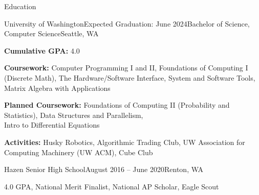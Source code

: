\documentclass{resume} %
\begin{document}
\vspace{-1.0em} %


\begin{rSection}{Education}

\begin{education}{University of Washington}{Expected Graduation: June 2024}{Bachelor of Science, Computer Science}{Seattle, WA}
\item {\bf Cumulative GPA:} 4.0
\item {\bf Coursework:} Computer Programming I and II, Foundations of Computing I (Discrete Math), The Hardware/Software Interface, System and Software Tools, Matrix Algebra with Applications
\item {\bf Planned Coursework:} Foundations of Computing II (Probability and Statistics), Data Structures and Parallelism, \\ Intro to Differential Equations
\item {\bf Activities:} Husky Robotics, Algorithmic Trading Club, UW Association for Computing Machinery (UW ACM), Cube Club
\end{education}

\begin{education}{Hazen Senior High School}{August 2016 – June 2020}{}{Renton, WA}
\item 4.0 GPA, National Merit Finalist, National AP Scholar, Eagle Scout
\end{education}

\end{rSection}

\end{document}
